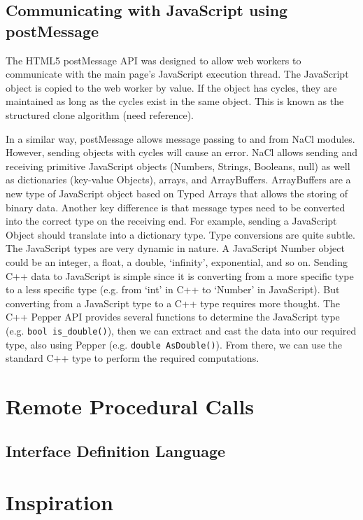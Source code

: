 \subsection{Communicating with JavaScript using postMessage}
The HTML5 postMessage API was designed to allow web workers to communicate with 
the main page's JavaScript execution thread. The JavaScript object is copied to 
the web worker by value. If the object has cycles, they are maintained as long 
as the cycles exist in the same object. This is known as the structured clone 
algorithm (need reference). 

In a similar way, postMessage allows message passing to and from NaCl modules. 
However, sending objects with cycles will cause an error. NaCl allows sending 
and receiving primitive JavaScript objects (Numbers, Strings, Booleans, null) 
as well as dictionaries (key-value Objects), arrays, and ArrayBuffers. 
ArrayBuffers are a new type of JavaScript object based on Typed Arrays 
\cite{typedarraysw3c} that allows the storing of binary data. Another key 
difference is that message types need to be converted into the correct type on 
the receiving end. For example, sending a JavaScript Object should translate 
into a dictionary type. Type conversions are quite subtle. The JavaScript types 
are very dynamic in nature. A JavaScript Number object could be an integer, a 
float, a double, `infinity', exponential, and so on. Sending C++ data to 
JavaScript is simple since it is converting from a more specific type to a less 
specific type (e.g. from `int' in C++ to `Number' in JavaScript). But 
converting from a JavaScript type to a C++ type requires more thought. The C++ 
Pepper API provides several functions to determine the JavaScript type (e.g. 
\verb+bool is_double()+), then we can extract and cast the data into our 
required type, also using Pepper (e.g. \verb+double AsDouble()+). From there, 
we can use the standard C++ type to perform the required computations.

\section{Remote Procedural Calls}


\subsection{Interface Definition Language}

\section{Inspiration}


